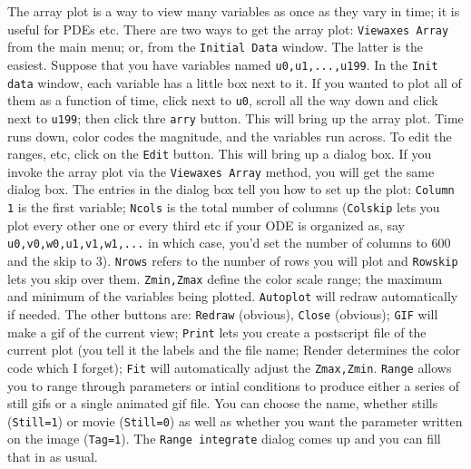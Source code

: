\documentclass{article}
\begin{document}
The array plot is a way to view many variables as once as they vary in time; it is useful for PDEs etc.  There are two ways to get the array plot: {\tt Viewaxes  Array} from the main menu; or, from the {\tt Initial Data} window. The latter is the easiest. Suppose that you have variables named {\tt u0,u1,...,u199}. In the {\tt Init data} window, each variable has a little box next to it. If you  wanted to plot all of them as a function of time, click next to {\tt u0}, scroll all the way down and click next to {\tt u199}; then click thre {\tt arry} button. This will bring up the array plot. Time runs down, color codes the magnitude, and the variables run across.  To edit the ranges, etc, click on the {\tt Edit} button.  This will bring up a dialog box. If you invoke the array plot via the {\tt Viewaxes Array} method, you will get the same dialog box. The entries in the dialog box tell you how to set up the plot: {\tt Column 1} is the first variable; {\tt Ncols} is the total number of columns ({\tt Colskip} lets you plot every other one or every third etc if your ODE is organized as, say {\tt u0,v0,w0,u1,v1,w1,...} in which case, you'd set the number of columns to 600 and the skip to 3).  {\tt Nrows} refers to the number of rows you will plot and {\tt Rowskip} lets you skip over them. {\tt Zmin,Zmax} define the color scale range; the maximum and minimum of the variables being plotted. {\tt Autoplot} will redraw automatically if needed. The other buttons are: {\tt Redraw} (obvious), {\tt Close} (obvious); {\tt GIF} will make a gif of the current view; {\tt Print} lets you create a postscript file of the current plot (you tell it the labels and the file name; Render determines the color code which I forget); {\tt Fit} will automatically adjust the {\tt Zmax,Zmin}. {\tt Range} allows you to range through parameters or intial conditions to produce  either a series of still gifs or a single animated gif file. You can choose the name, whether stills ({\tt Still=1}) or movie ({\tt Still=0}) as well as whether you want the parameter written on the image ({\tt Tag=1}). The {\tt Range integrate} dialog comes up and you can fill that in as usual.  
  
\end{document}
